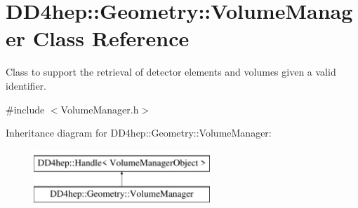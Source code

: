 \hypertarget{class_d_d4hep_1_1_geometry_1_1_volume_manager}{}\section{D\+D4hep\+:\+:Geometry\+:\+:Volume\+Manager Class Reference}
\label{class_d_d4hep_1_1_geometry_1_1_volume_manager}


Class to support the retrieval of detector elements and volumes given a valid identifier.  




{\ttfamily \#include $<$Volume\+Manager.\+h$>$}

Inheritance diagram for D\+D4hep\+:\+:Geometry\+:\+:Volume\+Manager\+:\begin{figure}[H]
\begin{center}
\leavevmode
\includegraphics[height=2.000000cm]{class_d_d4hep_1_1_geometry_1_1_volume_manager}
\end{center}
\end{figure}
